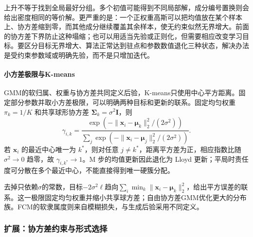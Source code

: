 上升不等于找到全局最好分组。多个初值可能得到不同局部解，成分编号置换则会给出密度相同的等价解。更严重的是：一个正权重高斯可以把均值放在某个样本上、协方差缩到零，而其他成分继续覆盖其余样本，使无约束似然无界增大。前面的协方差下界防止这种塌缩；也可以用适当先验或正则化，但需要相应改变学习目标。要区分目标无界增大、算法正常达到驻点和参数数值退化三种状态，解决办法是受约束参数域或明确先验，而不是只增加迭代。

\paragraph{小方差极限与K-means}

GMM的软归属、权重与协方差共同定义后验，K-means只使用中心平方距离。固定部分参数并取小方差极限，可以明确两种目标和更新的联系。固定均匀权重 $\pi_k=1/K$ 和共享球形协方差 $\bm{\Sigma}_k=\sigma^2\bm{I}$，则
\[
 \gamma_{i,k}=
 \frac{\exp(-\lVert\bm{x}_i-\bm{\mu}_k\rVert_2^2/(2\sigma^2))}
 {\sum_j\exp(-\lVert\bm{x}_i-\bm{\mu}_j\rVert_2^2/(2\sigma^2))}.
\]
若 $\bm{x}_i$ 的最近中心唯一为 $k^\ast$，则对任意 $j\ne k^\ast$，距离平方差为正，相应指数比随 $\sigma^2\to0$ 趋零，故 $\gamma_{i,k^\ast}\to1$。M 步的均值更新因此退化为 Lloyd 更新；平局时责任度可分散在多个最近中心，不能直接得到唯一硬簇分配。

去掉只依赖$\sigma$的常数，目标$-2\sigma^2\ell$趋向$\sum_i\min_k\lVert\bm{x}_i-\bm{\mu}_k\rVert_2^2$，给出平方误差的联系。这一极限固定均匀权重并缩小共享球方差；自由协方差GMM优化更大的分布族。FCM的软隶属度则来自模糊损失，与生成后验采用不同定义。

\subsubsection{扩展：协方差约束与形式选择}


